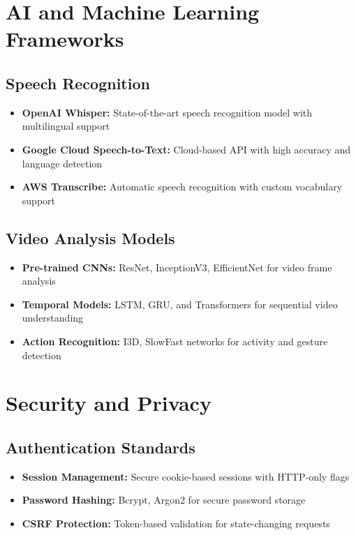\section{AI and Machine Learning Frameworks}

\subsection{Speech Recognition}

\begin{itemize}
    \item \textbf{OpenAI Whisper:} State-of-the-art speech recognition model with multilingual support
    \item \textbf{Google Cloud Speech-to-Text:} Cloud-based API with high accuracy and language detection
    \item \textbf{AWS Transcribe:} Automatic speech recognition with custom vocabulary support
\end{itemize}

\subsection{Video Analysis Models}

\begin{itemize}
    \item \textbf{Pre-trained CNNs:} ResNet, InceptionV3, EfficientNet for video frame analysis
    \item \textbf{Temporal Models:} LSTM, GRU, and Transformers for sequential video understanding
    \item \textbf{Action Recognition:} I3D, SlowFast networks for activity and gesture detection
\end{itemize}

\section{Security and Privacy}

\subsection{Authentication Standards}

\begin{itemize}
    \item \textbf{Session Management:} Secure cookie-based sessions with HTTP-only flags
    \item \textbf{Password Hashing:} Bcrypt, Argon2 for secure password storage
    \item \textbf{CSRF Protection:} Token-based validation for state-changing requests
\end{itemize}

